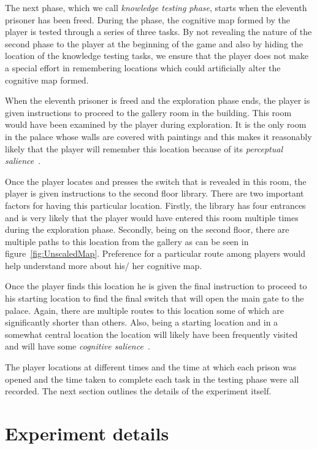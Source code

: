 The next phase, which we call \emph{knowledge testing phase}, starts when the eleventh prisoner has been freed. During the phase, the cognitive map formed by the player is tested through a series of three tasks. By not revealing the nature of the second phase to the player at the beginning of the game and also by hiding the location of the knowledge testing tasks, we ensure that the player does not make a special effort in remembering locations which could artificially alter the cognitive map formed.

When the eleventh prisoner is freed and the exploration phase ends, the player is given instructions to proceed to the gallery room in the building. This room would have been examined by the player during exploration. It is the only room in the palace whose walls are covered with paintings and this makes it reasonably likely that the player will remember this location because of its \emph{perceptual salience}~\cite{Davis01122009}.

Once the player locates and presses the switch that is revealed in this room, the player is given instructions to the second floor library. There are two important factors for having this particular location. Firstly, the library has four entrances and is very likely that the player would have entered this room multiple times during the exploration phase. Secondly, being on the second floor, there are multiple paths to this location from the gallery as can be seen in figure~\ref{fig:UnscaledMap}. Preference for a particular route among players would help understand more about his/ her cognitive map.

Once the player finds this location he is given the final instruction to proceed to his starting location to find the final switch that will open the main gate to the palace. Again, there are multiple routes to this location some of which are significantly shorter than others. Also, being a starting location and in a somewhat central location the location will likely have been frequently visited and will have some \emph{cognitive salience}~\cite{Davis01122009}.

The player locations at different times and the time at which each prison was opened and the time taken to complete each task in the testing phase were all recorded. The next section outlines the details of the experiment itself.


\section{Experiment details} %
\label{sec:experiment_details}

